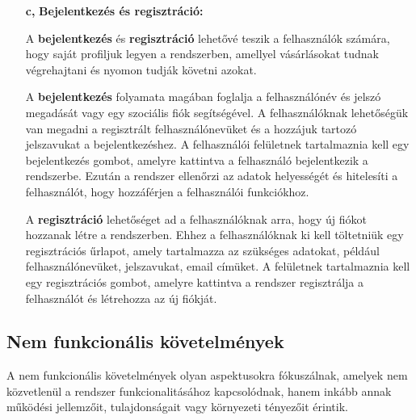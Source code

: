 \begin{itemize}
  	\item[\textbf{c,}] \textbf{Bejelentkezés és regisztráció:}

A \textbf{bejelentkezés} és \textbf{regisztráció} lehetővé teszik a felhasználók számára, hogy saját profiljuk legyen a rendszerben, amellyel vásárlásokat tudnak végrehajtani és nyomon tudják követni azokat.

A \textbf{bejelentkezés} folyamata magában foglalja a felhasználónév és jelszó megadását vagy egy szociális fiók segítségével. A felhasználóknak lehetőségük van megadni a regisztrált felhasználónevüket és a hozzájuk tartozó jelszavukat a bejelentkezéshez. A felhasználói felületnek tartalmaznia kell egy bejelentkezés gombot, amelyre kattintva a felhasználó bejelentkezik a rendszerbe. Ezután a rendszer ellenőrzi az adatok helyességét és hitelesíti a felhasználót, hogy hozzáférjen a felhasználói funkciókhoz.

A \textbf{regisztráció} lehetőséget ad a felhasználóknak arra, hogy új fiókot hozzanak létre a rendszerben. Ehhez a felhasználóknak ki kell töltetniük egy regisztrációs űrlapot, amely tartalmazza az szükséges adatokat, például felhasználónevüket, jelszavukat, email címüket. A felületnek tartalmaznia kell egy regisztrációs gombot, amelyre kattintva a rendszer regisztrálja a felhasználót és létrehozza az új fiókját.
\end{itemize}

\subsection {Nem funkcionális követelmények}

A nem funkcionális követelmények olyan aspektusokra fókuszálnak, amelyek nem közvetlenül a rendszer funkcionalitásához kapcsolódnak, hanem inkább annak működési jellemzőit, tulajdonságait vagy környezeti tényezőit érintik.

